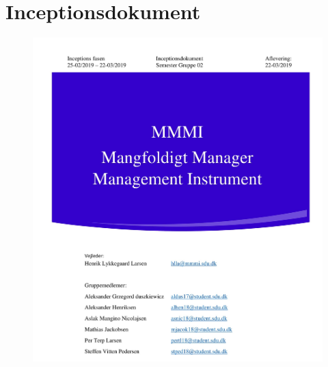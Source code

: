 
\section{Inceptionsdokument} \label{in:inceptions}

\begin{figure}[hb]
\begin{center}
  \includegraphics[scale = 0.33]{./PNG/Inceptions/Gruppe02+InceptionsDokument-01.jpg} 
\end{center}
\end{figure}



